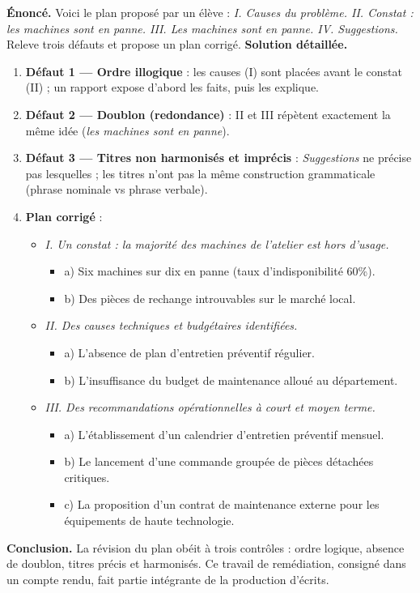 \documentclass[11pt]{article}
\begin{document}
\begin{exoresolu}
\textbf{Énoncé.} Voici le plan proposé par un élève : \emph{I. Causes du problème. II. Constat : les machines sont en panne. III. Les machines sont en panne. IV. Suggestions.} Releve trois défauts et propose un plan corrigé.
\tcblower
\textbf{Solution détaillée.}
\begin{enumerate}
\item \textbf{Défaut 1 — Ordre illogique} : les causes (I) sont placées avant le constat (II) ; un rapport expose d'abord les faits, puis les explique.
\item \textbf{Défaut 2 — Doublon (redondance)} : II et III répètent exactement la même idée (\emph{les machines sont en panne}).
\item \textbf{Défaut 3 — Titres non harmonisés et imprécis} : \emph{Suggestions} ne précise pas lesquelles ; les titres n'ont pas la même construction grammaticale (phrase nominale vs phrase verbale).
\item \textbf{Plan corrigé} :
\begin{itemize}
\item \emph{I. Un constat : la majorité des machines de l'atelier est hors d'usage.}
\begin{itemize}
\item a) Six machines sur dix en panne (taux d'indisponibilité 60\%).
\item b) Des pièces de rechange introuvables sur le marché local.
\end{itemize}
\item \emph{II. Des causes techniques et budgétaires identifiées.}
\begin{itemize}
\item a) L'absence de plan d'entretien préventif régulier.
\item b) L'insuffisance du budget de maintenance alloué au département.
\end{itemize}
\item \emph{III. Des recommandations opérationnelles à court et moyen terme.}
\begin{itemize}
\item a) L'établissement d'un calendrier d'entretien préventif mensuel.
\item b) Le lancement d'une commande groupée de pièces détachées critiques.
\item c) La proposition d'un contrat de maintenance externe pour les équipements de haute technologie.
\end{itemize}
\end{itemize}
\end{enumerate}
\textbf{Conclusion.} La révision du plan obéit à trois contrôles : ordre logique, absence de doublon, titres précis et harmonisés. Ce travail de remédiation, consigné dans un compte rendu, fait partie intégrante de la production d'écrits.
\end{exoresolu}
\end{document}
